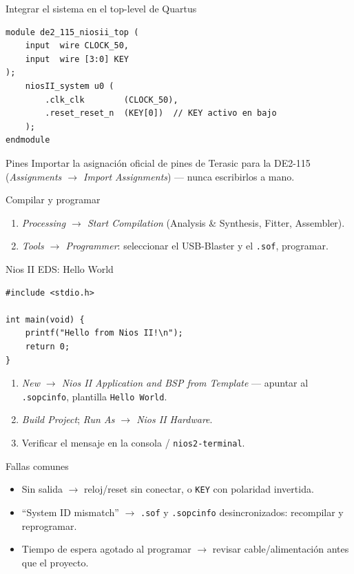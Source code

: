 \documentclass[11pt]{beamer}
\begin{document}
\begin{frame}[fragile]{Integrar el sistema en el top-level de Quartus}
\begin{lstlisting}[style=vstyle]
module de2_115_niosii_top (
    input  wire CLOCK_50,
    input  wire [3:0] KEY
);
    niosII_system u0 (
        .clk_clk        (CLOCK_50),
        .reset_reset_n  (KEY[0])  // KEY activo en bajo
    );
endmodule
\end{lstlisting}
  \begin{alertblock}{Pines}
    Importar la asignación oficial de pines de Terasic para la DE2-115
    (\emph{Assignments $\to$ Import Assignments}) --- nunca escribirlos a mano.
  \end{alertblock}
\end{frame}

\begin{frame}{Compilar y programar}
  \begin{enumerate}
    \item \emph{Processing $\to$ Start Compilation} (Analysis \& Synthesis, Fitter, Assembler).
    \item \emph{Tools $\to$ Programmer}: seleccionar el USB-Blaster y el \texttt{.sof}, programar.
  \end{enumerate}
\end{frame}

\begin{frame}[fragile]{Nios II EDS: Hello World}
\begin{lstlisting}
#include <stdio.h>

int main(void) {
    printf("Hello from Nios II!\n");
    return 0;
}
\end{lstlisting}
  \begin{enumerate}
    \item \emph{New $\to$ Nios II Application and BSP from Template} --- apuntar al
          \texttt{.sopcinfo}, plantilla \texttt{Hello World}.
    \item \emph{Build Project}; \emph{Run As $\to$ Nios II Hardware}.
    \item Verificar el mensaje en la consola / \texttt{nios2-terminal}.
  \end{enumerate}
\end{frame}

\begin{frame}{Fallas comunes}
  \begin{itemize}
    \item Sin salida $\to$ reloj/reset sin conectar, o \texttt{KEY} con polaridad invertida.
    \item ``System ID mismatch'' $\to$ \texttt{.sof} y \texttt{.sopcinfo} desincronizados:
          recompilar y reprogramar.
    \item Tiempo de espera agotado al programar $\to$ revisar cable/alimentación antes que el
          proyecto.
  \end{itemize}
\end{frame}
\end{document}
